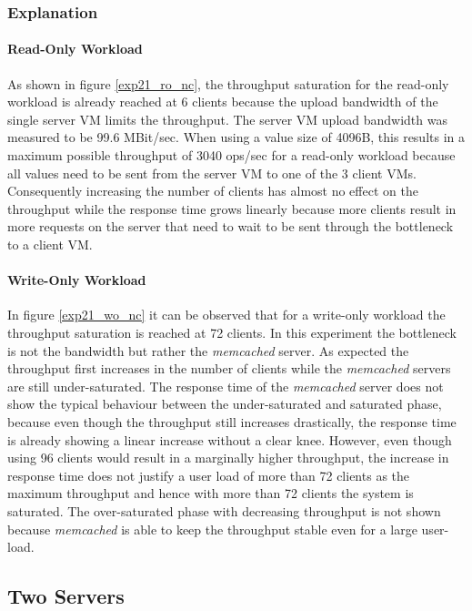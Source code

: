 \documentclass[report.tex]{subfiles}
\begin{document}
\subsubsection{Explanation}

\paragraph{Read-Only Workload}
As shown in figure \ref{exp21_ro_nc}, the throughput saturation for the read-only workload is already reached at 6 clients because the upload bandwidth of the single server VM limits the throughput. The server VM upload bandwidth was measured to be 99.6 MBit/sec. When using a value size of 4096B, this results in a maximum possible throughput of 3040 ops/sec for a read-only workload because all values need to be sent from the server VM to one of the 3 client VMs. 
Consequently increasing the number of clients has almost no effect on the throughput while the response time grows linearly because more clients result in more requests on the server that need to wait to be sent through the bottleneck to a client VM.

\paragraph{Write-Only Workload}
In figure \ref{exp21_wo_nc} it can be observed that for a write-only workload the throughput saturation is reached at 72 clients. In this experiment the bottleneck is not the bandwidth but rather the \emph{memcached} server. 
As expected the throughput first increases in the number of clients while the \emph{memcached} servers are still under-saturated. The response time of the \emph{memcached} server does not show the typical behaviour between the under-saturated and saturated phase, because even though the throughput still increases drastically, the response time is already showing a linear increase without a clear knee.
However, even though using 96 clients would result in a marginally higher throughput, the increase in response time does not justify a user load of more than 72 clients as the maximum throughput and hence with more than 72 clients the system is saturated. The over-saturated phase with decreasing throughput is not shown because \emph{memcached} is able to keep the throughput stable even for a large user-load.


\subsection{Two Servers}\label{exp22}
\end{document}
